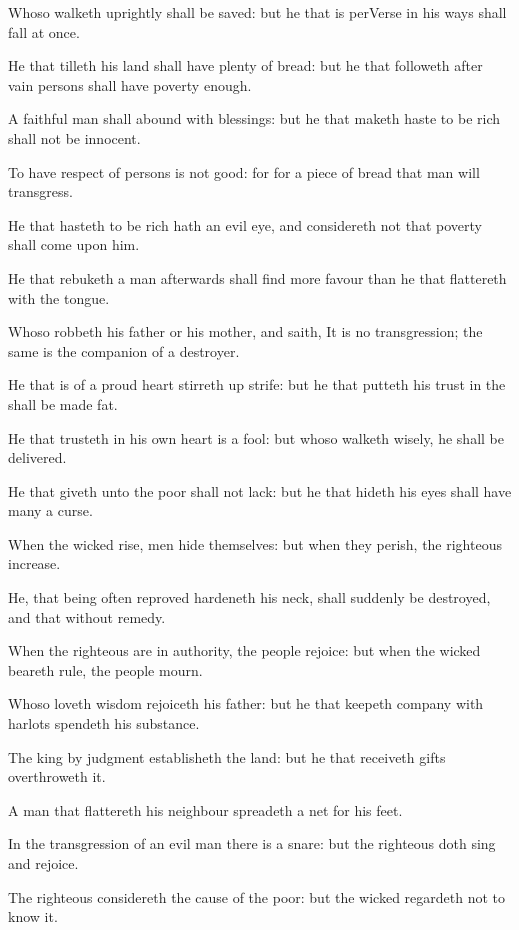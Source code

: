 \Verse Whoso walketh uprightly shall be saved: but he that is perVerse in his ways shall fall at once.

\Verse He that tilleth his land shall have plenty of bread: but he that followeth after vain persons shall have poverty enough.

\Verse A faithful man shall abound with blessings: but he that maketh haste to be rich shall not be innocent.

\Verse To have respect of persons is not good: for for a piece of bread that man will transgress.

\Verse He that hasteth to be rich hath an evil eye, and considereth not that poverty shall come upon him.

\Verse He that rebuketh a man afterwards shall find more favour than he that flattereth with the tongue.

\Verse Whoso robbeth his father or his mother, and saith, It is no transgression; the same is the companion of a destroyer.

\Verse He that is of a proud heart stirreth up strife: but he that putteth his trust in the \LORD shall be made fat.

\Verse He that trusteth in his own heart is a fool: but whoso walketh wisely, he shall be delivered.

\Verse He that giveth unto the poor shall not lack: but he that hideth his eyes shall have many a curse.

\Verse When the wicked rise, men hide themselves: but when they perish, the righteous increase.


\Chapter
\Verse He, that being often reproved hardeneth his neck, shall suddenly be destroyed, and that without remedy.

\Verse When the righteous are in authority, the people rejoice: but when the wicked beareth rule, the people mourn.

\Verse Whoso loveth wisdom rejoiceth his father: but he that keepeth company with harlots spendeth his substance.

\Verse The king by judgment establisheth the land: but he that receiveth gifts overthroweth it.

\Verse A man that flattereth his neighbour spreadeth a net for his feet.

\Verse In the transgression of an evil man there is a snare: but the righteous doth sing and rejoice.

\Verse The righteous considereth the cause of the poor: but the wicked regardeth not to know it.

